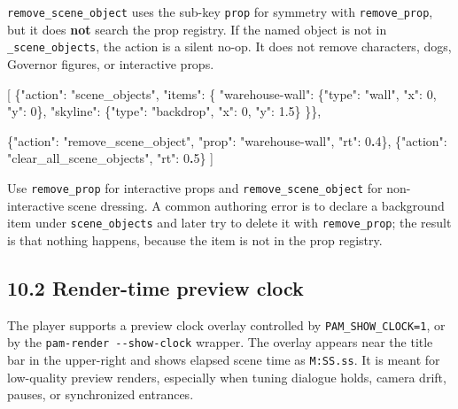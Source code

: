 \documentclass[
  11pt,
]{book}
\newenvironment{Shaded}{}{}
\newcommand{\DataTypeTok}[1]{\textcolor[rgb]{0.56,0.13,0.00}{#1}}
\newcommand{\DecValTok}[1]{\textcolor[rgb]{0.25,0.63,0.44}{#1}}
\newcommand{\ErrorTok}[1]{\textcolor[rgb]{1.00,0.00,0.00}{\textbf{#1}}}
\newcommand{\FloatTok}[1]{\textcolor[rgb]{0.25,0.63,0.44}{#1}}
\newcommand{\FunctionTok}[1]{\textcolor[rgb]{0.02,0.16,0.49}{#1}}
\newcommand{\OtherTok}[1]{\textcolor[rgb]{0.00,0.44,0.13}{#1}}
\newcommand{\StringTok}[1]{\textcolor[rgb]{0.25,0.44,0.63}{#1}}
\begin{document}
\texttt{remove\_scene\_object} uses the sub-key \texttt{prop} for
symmetry with \texttt{remove\_prop}, but it does \textbf{not} search the
prop registry. If the named object is not in \texttt{\_scene\_objects},
the action is a silent no-op. It does not remove characters, dogs,
Governor figures, or interactive props.

\begin{Shaded}
\begin{Highlighting}[]
\OtherTok{[}
  \FunctionTok{\{}\DataTypeTok{"action"}\FunctionTok{:} \StringTok{"scene\_objects"}\FunctionTok{,} \DataTypeTok{"items"}\FunctionTok{:} \FunctionTok{\{}
    \DataTypeTok{"warehouse{-}wall"}\FunctionTok{:} \FunctionTok{\{}\DataTypeTok{"type"}\FunctionTok{:} \StringTok{"wall"}\FunctionTok{,} \DataTypeTok{"x"}\FunctionTok{:} \DecValTok{0}\FunctionTok{,} \DataTypeTok{"y"}\FunctionTok{:} \DecValTok{0}\FunctionTok{\},}
    \DataTypeTok{"skyline"}\FunctionTok{:}        \FunctionTok{\{}\DataTypeTok{"type"}\FunctionTok{:} \StringTok{"backdrop"}\FunctionTok{,} \DataTypeTok{"x"}\FunctionTok{:} \DecValTok{0}\FunctionTok{,} \DataTypeTok{"y"}\FunctionTok{:} \FloatTok{1.5}\FunctionTok{\}}
  \FunctionTok{\}\}}\OtherTok{,}

  \FunctionTok{\{}\DataTypeTok{"action"}\FunctionTok{:} \StringTok{"remove\_scene\_object"}\FunctionTok{,} \DataTypeTok{"prop"}\FunctionTok{:} \StringTok{"warehouse{-}wall"}\FunctionTok{,} \DataTypeTok{"rt"}\FunctionTok{:} \DecValTok{0}\ErrorTok{.}\DecValTok{4}\FunctionTok{\}}\OtherTok{,}
  \FunctionTok{\{}\DataTypeTok{"action"}\FunctionTok{:} \StringTok{"clear\_all\_scene\_objects"}\FunctionTok{,} \DataTypeTok{"rt"}\FunctionTok{:} \DecValTok{0}\ErrorTok{.}\DecValTok{5}\FunctionTok{\}}
\OtherTok{]}
\end{Highlighting}
\end{Shaded}

Use \texttt{remove\_prop} for interactive props and
\texttt{remove\_scene\_object} for non-interactive scene dressing. A
common authoring error is to declare a background item under
\texttt{scene\_objects} and later try to delete it with
\texttt{remove\_prop}; the result is that nothing happens, because the
item is not in the prop registry.

\subsection{10.2 Render-time preview
clock}\label{render-time-preview-clock}

The player supports a preview clock overlay controlled by
\texttt{PAM\_SHOW\_CLOCK=1}, or by the
\texttt{pam-render\ -\/-show-clock} wrapper. The overlay appears near
the title bar in the upper-right and shows elapsed scene time as
\texttt{M:SS.ss}. It is meant for low-quality preview renders,
especially when tuning dialogue holds, camera drift, pauses, or
synchronized entrances.
\end{document}
